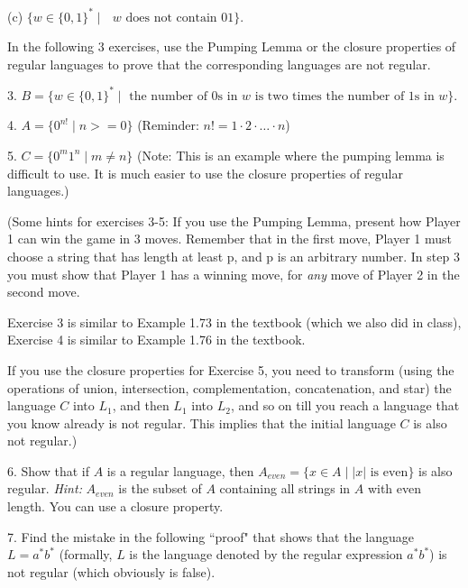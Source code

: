 \documentclass[11pt]{article}
\begin{document}
(c)	$\{w  \in \{0, 1\}^*  \mid \mbox{ $w$ does not contain $01$} \}$.
\medskip


In the following $3$ exercises, use the Pumping Lemma or the closure properties of regular languages to prove that the  corresponding languages are not regular.
\medskip

3. 	$B=\{w  \in \{0, 1\}^* \mid \mbox{ the number of 0s in $w$ is two times the number of 1s in $w$}\}$.
\medskip




4. 	$A = \{0^{n!} \mid n >= 0 \}$ (Reminder: $n! = 1  \cdot 2 \cdot  \ldots \cdot  n$)
\medskip


5. 	$C = \{0^m1^n  \mid  m \not= n \}$ (Note: This is an example where the pumping lemma is difficult to use.   It is much easier to use the closure properties of regular languages.)
\medskip

{\small
(Some hints for exercises 3-5: If you use the Pumping Lemma, present how Player 1 can win the game in 3 moves. Remember that in the first move, Player 1 must choose a string that has length at least p, and p is an arbitrary number. In step 3 you must show that Player 1 has a winning move, for \emph{any} move of Player 2 in the second move. 

Exercise 3 is similar to Example 1.73 in the textbook (which we also did in class), Exercise 4 is similar to Example 1.76 in the textbook.

If you use the closure properties for Exercise 5, you need to transform (using the operations of union, intersection, complementation, concatenation, and star) the language $C$ into $L_1$, and then $L_1$ into $L_2$, and so on till you reach a language that you know already is not regular.
This implies that the initial language $C$ is also not regular.)
}
\medskip

6. Show that if $A$ is a regular language, then $A_{even} = \{x \in A \mid |x| \textrm{ is even} \}$ is also regular. \emph{Hint:} $A_{even}$ is the subset of $A$ containing all strings in $A$ with even length. You can use a closure property.
\bigskip



7.  Find the mistake in the following ``proof" that shows that the language $L = a^* b^*$ (formally, $L$ is the language denoted by the regular expression $a^* b^*$) is not regular (which obviously is false).
\medskip
\end{document}
